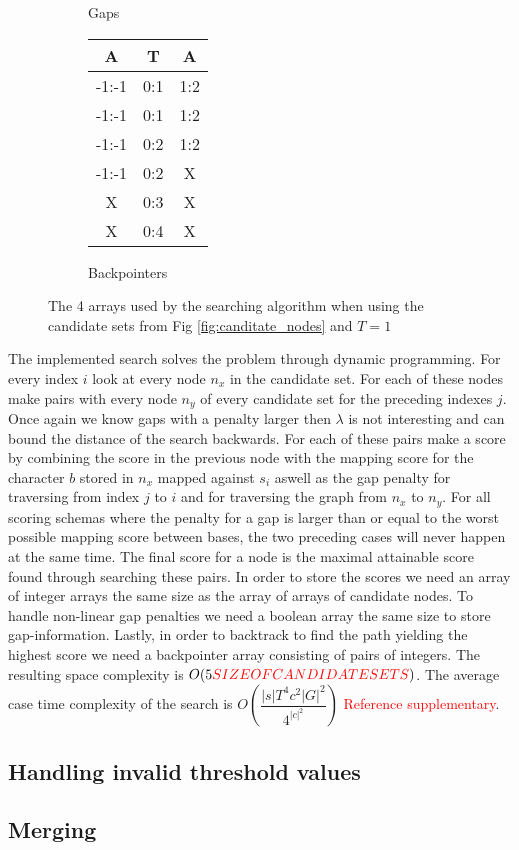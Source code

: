 \documentclass{article}
\begin{document}
\begin{wrapfigure}{l}{0.5\textwidth}
\begin{subfigure}[b]{0.49\textwidth}
    \caption{Gaps}
  \end{subfigure}
  \begin{subfigure}[b]{0.49\textwidth}
    \begin{center}
      \begin{tabular}{|c|c|c|}
        A & T & A \\ \hline 
        -1:-1 & 0:1 & 1:2 \\ \hline
        -1:-1 & 0:1 & 1:2 \\ \hline
        -1:-1 & 0:2 & 1:2 \\ \hline
        -1:-1 & 0:2 & X \\ \hline
        X & 0:3 & X \\ \hline
        X & 0:4 & X \\ \hline
      \end{tabular}
    \end{center}
    \caption{Backpointers}
  \end{subfigure}
  \caption{The 4 arrays used by the searching algorithm when using the candidate sets from Fig \ref{fig:canditate_nodes} and $T=1$}
  \label{fig:scoring_arrays}
\end{wrapfigure}
The implemented search solves the problem through dynamic programming. For every index $i$ look at every node $n_x$ in the candidate set. For each of these nodes make pairs with every node $n_y$ of every candidate set for the preceding indexes $j$. Once again we know gaps with a penalty larger then $\lambda$ is not interesting and can bound the distance of the search backwards. For each of these pairs make a score by combining the score in the previous node with the mapping score for the character $b$ stored in $n_x$ mapped against $s_i$ aswell as the gap penalty for traversing from index $j$ to $i$ and for traversing the graph from $n_x$ to $n_y$. For all scoring schemas where the penalty for a gap is larger than or equal to the worst possible mapping score between bases, the two preceding cases will never happen at the same time. The final score for a node is the maximal attainable score found through searching these pairs. In order to store the scores we need an array of integer arrays the same size as the array of arrays of candidate nodes. To handle non-linear gap penalties we need a boolean array the same size to store gap-information. Lastly, in order to backtrack to find the path yielding the highest score we need a backpointer array consisting of pairs of integers. The resulting space complexity is $O(5\textcolor{red}{SIZE OF CANDIDATE SETS})$. The average case time complexity of the search is $O(\dfrac{|s|T^4c^2|G|^2}{4^{|c|^2}})$ \textcolor{red}{Reference supplementary}.
\subsection{Handling invalid threshold values}
\subsection{Merging}
\end{document}
